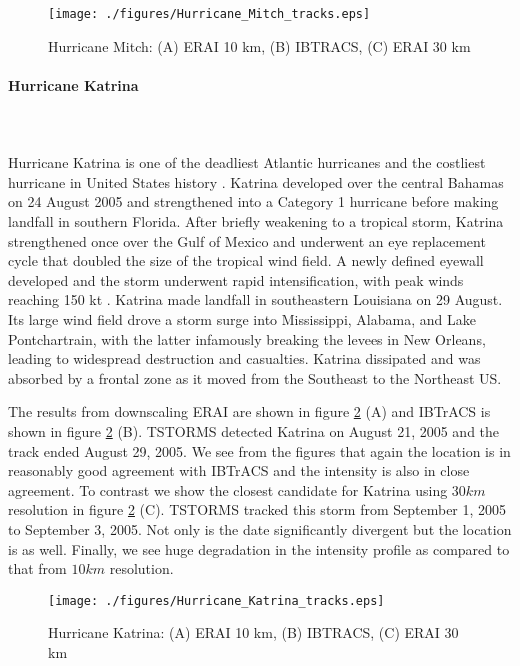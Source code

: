 \documentclass[smallextended]{svjour3}       %
\newcommand{\myparagraph}[1]{\paragraph{#1}\mbox{}\\\mbox{}\\}
\begin{document}
\begin{figure}[!tbp]
\centering
\texttt{[image: ./figures/Hurricane\_Mitch\_tracks.eps]}
\caption{Hurricane Mitch: (A) ERAI 10 km, (B) IBTRACS, (C) ERAI 30 km}
\label{mitch_tracks}
\end{figure}

\myparagraph{Hurricane Katrina}
Hurricane Katrina is one of the deadliest Atlantic hurricanes and the costliest hurricane in United States history \cite{beven}.  Katrina developed over the central Bahamas on 24 August 2005 and strengthened into a Category 1 hurricane before making landfall in southern Florida.  After briefly weakening to a tropical storm, Katrina strengthened once over the Gulf of Mexico and underwent an eye replacement cycle that doubled the size of the tropical wind field.  A newly defined eyewall developed and the storm underwent rapid intensification, with peak winds reaching 150 kt \cite{beven}.  Katrina made landfall in southeastern Louisiana on 29 August.  Its large wind field drove a storm surge into Mississippi, Alabama, and Lake Pontchartrain, with the latter infamously breaking the levees in New Orleans, leading to widespread destruction and casualties.  Katrina dissipated and was absorbed by a frontal zone as it moved from the Southeast to the Northeast US.
\par
The results from downscaling ERAI are shown in figure \ref{katrina_tracks} (A) and IBTrACS is shown in figure \ref{katrina_tracks} (B). TSTORMS detected Katrina on August 21, 2005 and the track ended August 29, 2005. We see from the figures that again the location is in reasonably good agreement with IBTrACS and the intensity is also in close agreement. To contrast we show the closest candidate for Katrina using $30km$ resolution in figure \ref{katrina_tracks} (C). TSTORMS tracked this storm from September 1, 2005 to September 3, 2005. Not only is the date significantly divergent but the location is as well. Finally, we see huge degradation in the intensity profile as compared to that from $10km$ resolution.    

\begin{figure}[!tbp]
\centering
\texttt{[image: ./figures/Hurricane\_Katrina\_tracks.eps]}
\caption{Hurricane Katrina: (A) ERAI 10 km, (B) IBTRACS, (C) ERAI 30 km}
\label{katrina_tracks}
\end{figure}
\end{document}
